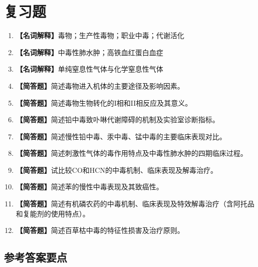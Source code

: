 \section{复习题}

\begin{enumerate}[leftmargin=*, itemsep=8pt]
    \item \textbf{【名词解释】}毒物；生产性毒物；职业中毒；代谢活化
    \item \textbf{【名词解释】}中毒性肺水肿；高铁血红蛋白血症
    \item \textbf{【名词解释】}单纯窒息性气体与化学窒息性气体
    \item \textbf{【简答题】}简述毒物进入机体的主要途径及影响因素。
    \item \textbf{【简答题】}简述毒物生物转化的I相和II相反应及其意义。
    \item \textbf{【简答题】}简述铅中毒致卟啉代谢障碍的机制及实验室诊断指标。
    \item \textbf{【简答题】}简述慢性铅中毒、汞中毒、锰中毒的主要临床表现对比。
    \item \textbf{【简答题】}简述刺激性气体的毒作用特点及中毒性肺水肿的四期临床过程。
    \item \textbf{【简答题】}试比较CO和HCN的中毒机制、临床表现及解毒治疗。
    \item \textbf{【简答题】}简述苯的慢性中毒表现及其致癌性。
    \item \textbf{【简答题】}简述有机磷农药的中毒机制、临床表现及特效解毒治疗（含阿托品和复能剂的使用特点）。
    \item \textbf{【简答题】}简述百草枯中毒的特征性损害及治疗原则。
\end{enumerate}

\subsection*{参考答案要点}

